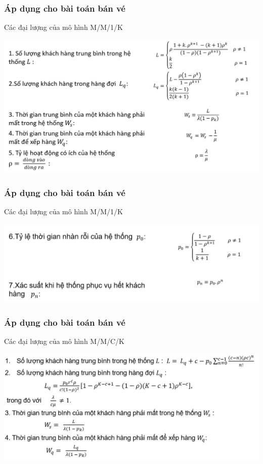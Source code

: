 \documentclass[10pt]{beamer}
\begin{document}
\begin{frame}
	\frametitle{Áp dụng cho bài toán bán vé}
	\begin{block}{Các đại lượng của mô hình M/M/1/K}
\begin{center}
    \includegraphics[scale=.5]{img/MM1k.PNG}
\end{center}

\end{block}
\end{frame}
\begin{frame}
	\frametitle{Áp dụng cho bài toán bán vé}
	\begin{block}{Các đại lượng của mô hình M/M/1/K}
\begin{center}
    \includegraphics[scale=.5]{img/MM1k.2.PNG}
\end{center}

\end{block}
\end{frame}
\begin{frame}
	\frametitle{Áp dụng cho bài toán bán vé}
	\begin{block}{Các đại lượng của mô hình M/M/C/K}
\begin{center}
    \includegraphics[scale=.5]{img/mmck.1.PNG}
\end{center}

\end{block}
\end{frame}
\end{document}
